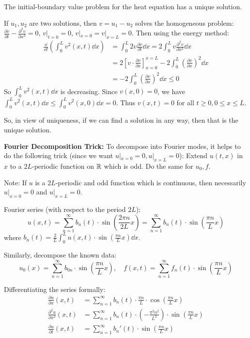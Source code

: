 \begin{theorem}[Uniqueness]
The initial-boundary value problem for the heat equation has a unique solution.
\end{theorem}
\begin{proofbox}
If $u_1, u_2$ are two solutions, then $v = u_1 - u_2$ solves the homogeneous problem:
$\frac{\partial v}{\partial t} - \frac{\partial^2 v}{\partial x^2} = 0$, $v|_{t=0} = 0$, $v|_{x=0} = v|_{x=L} = 0$.
Then using the energy method:
\begin{align*}
\frac{\dd}{\dd t} \left( \int_0^L v^2(x,t) \dd x \right) &= \int_0^L 2 v \frac{\partial v}{\partial t} \dd x = 2 \int_0^L v \frac{\partial^2 v}{\partial x^2} \dd x \\
&= 2 \left[ v \cdot \frac{\partial v}{\partial x} \right]_{x=0}^{x=L} - 2 \int_0^L \left(\frac{\partial v}{\partial x}\right)^2 \dd x \\
&= -2 \int_0^L \left(\frac{\partial v}{\partial x}\right)^2 \dd x \le 0
\end{align*}
So $\int_0^L v^2(x,t) \dd x$ is decreasing. Since $v(x,0) = 0$, we have $\int_0^L v^2(x,t) \dd x \le \int_0^L v^2(x,0) \dd x = 0$.
Thus $v(x,t) = 0$ for all $t \ge 0, 0 \le x \le L$.
\end{proofbox}

So, in view of uniqueness, if we can find a solution in any way, then that is the unique solution.

\textbf{Fourier Decomposition Trick:}
To decompose into Fourier modes, it helps to do the following trick (since we want $u|_{x=0} = 0, u|_{x=L} = 0$): Extend $u(t,x)$ in $x$ to a $2L$-periodic function on $\mathbb{R}$ which is odd. Do the same for $u_0, f$.

Note: If $u$ is a $2L$-periodic and odd function which is continuous, then necessarily $u|_{x=0} = 0$ and $u|_{x=L} = 0$.

Fourier series (with respect to the period $2L$):
$$u(x,t) = \sum_{n=1}^\infty b_n(t) \cdot \sin\left(\frac{2\pi n}{2L} x\right) = \sum_{n=1}^\infty b_n(t) \cdot \sin\left(\frac{\pi n}{L} x\right)$$
where $b_n(t) = \frac{2}{L} \int_0^L u(x,t) \cdot \sin\left(\frac{\pi n}{L} x\right) \dd x$.

Similarly, decompose the known data:
$$u_0(x) = \sum_{n=1}^\infty b_{0n} \cdot \sin\left(\frac{\pi n}{L} x\right), \quad f(x,t) = \sum_{n=1}^\infty f_n(t) \cdot \sin\left(\frac{\pi n}{L} x\right)$$

Differentiating the series formally:
\begin{align*}
\frac{\partial u}{\partial x}(x,t) &= \sum_{n=1}^\infty b_n(t) \cdot \frac{\pi n}{L} \cdot \cos\left(\frac{\pi n}{L} x\right) \\
\frac{\partial^2 u}{\partial x^2}(x,t) &= \sum_{n=1}^\infty b_n(t) \cdot \left(-\frac{\pi^2 n^2}{L^2}\right) \cdot \sin\left(\frac{\pi n}{L} x\right) \\
\frac{\partial u}{\partial t}(x,t) &= \sum_{n=1}^\infty b_n'(t) \cdot \sin\left(\frac{\pi n}{L} x\right)
\end{align*}

